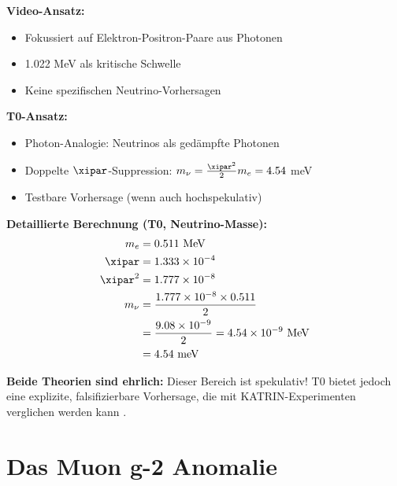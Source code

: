	\begin{vergleich}
		\textbf{Video-Ansatz:}
		\begin{itemize}
			\item Fokussiert auf Elektron-Positron-Paare aus Photonen
			\item 1.022 MeV als kritische Schwelle
			\item Keine spezifischen Neutrino-Vorhersagen
		\end{itemize}
		
		\textbf{T0-Ansatz:}
		\begin{itemize}
			\item Photon-Analogie: Neutrinos als gedämpfte Photonen
			\item Doppelte $\xipar$-Suppression: $m_\nu = \frac{\xipar^2}{2} m_e = 4.54$ meV
			\item Testbare Vorhersage (wenn auch hochspekulativ)
		\end{itemize}
		
		\textbf{Detaillierte Berechnung (T0, Neutrino-Masse):}
		\begin{align}
			m_e &= 0.511 \text{ MeV} \\
			\xipar &= 1.333 \times 10^{-4} \\
			\xipar^2 &= 1.777 \times 10^{-8} \\
			m_\nu &= \frac{1.777 \times 10^{-8} \times 0.511}{2} \\
			&= \frac{9.08 \times 10^{-9}}{2} = 4.54 \times 10^{-9} \text{ MeV} \\
			&= 4.54 \text{ meV}
		\end{align}
	\end{vergleich}
	
	\textbf{Beide Theorien sind ehrlich:} Dieser Bereich ist spekulativ! T0 bietet jedoch eine explizite, falsifizierbare Vorhersage, die mit KATRIN-Experimenten verglichen werden kann \cite{katrin_2022}.
	
	\section{Das Muon g-2 Anomalie}
	
